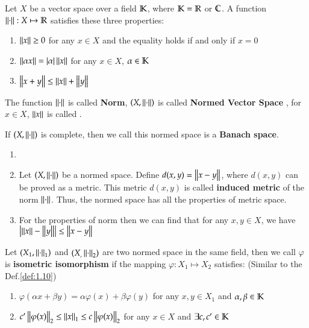 \begin{definition}\label{def:1.13}
    Let $X$ be a vector space over a field $\mathbb{K}$, where $\mathbb{K} = \mathbb{R}$ or $\mathbb{C}$. A function $\Norm{\cdot}: X \mapsto \R$ satisfies these three properties:
    \begin{enumerate}[itemsep=0pt, topsep=0pt]
        \item $\Norm{x} \geq 0$ for any $x \in X$ and the equality holds if and only if $x = 0$
        \item $\Norm{\alpha x} = \Abs{\alpha}\Norm{x}$ for any $x \in X$, $\alpha \in \mathbb{K}$
        \item $\Norm{x + y} \leq \Norm{x} + \Norm{y}$
    \end{enumerate}
    The function $\Norm{\cdot}$ is called \textbf{Norm}, $(X, \Norm{\cdot})$ is called \textbf{Normed Vector Space} , for $x \in X$, $\Norm{x}$ is called .
    
    If $(X, \Norm{\cdot})$ is complete, then we call this normed space is a \textbf{Banach space}.
\end{definition}
\begin{Remark}
\begin{enumerate}[itemsep=0pt, topsep=0pt]
    \item[]
    \item Let $(X, \Norm{\cdot})$ be a normed space. Define $d(x, y) = \Norm{x - y}$, where $d(x, y)$ can be
          proved as a metric. This metric $d(x, y)$ is called \textbf{induced metric} of the norm $\Norm{\cdot}$. Thus, the normed space has all the properties of metric space.
    \item For the properties of norm then we can find that for any $x, y \in X$, we have $\Abs{\Norm{x} -         \Norm{y}} \leq \Norm{x - y}$
\end{enumerate}
\end{Remark}

\begin{definition}\label{def:1.14}
Let $(X_1, \Norm{\cdot}_1)$ and $(X_, \Norm{\cdot}_2)$ are two normed space in the same field, then we call $\varphi$ is \textbf{isometric isomorphism} if the mapping $\varphi: X_1 \mapsto X_2$ satisfies: (Similar to the Def.\ref{def:1.10})
    \begin{enumerate}[itemsep=0pt, topsep=0pt]
        \item $\varphi(\alpha x + \beta y) = \alpha \varphi(x) + \beta \varphi(y)$ \quad for any $x, y \in X_1$ and $\alpha, \beta \in \mathbb{K}$
        \item $c^{\prime} \Norm{\varphi(x)}_2 \leq \Norm{x}_1 \leq c \Norm{\varphi(x)}_2$ \quad for any $x \in X$ and $\exists c, c^{\prime} \in \mathbb{K}$
    \end{enumerate}
\end{definition}

